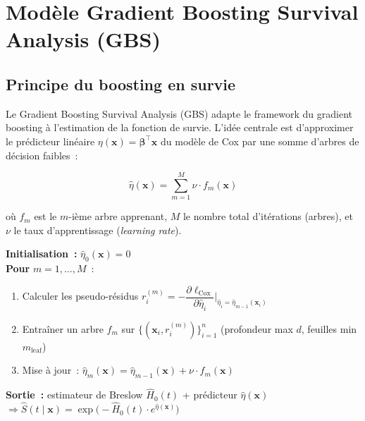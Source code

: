 \documentclass[a4paper,11pt]{article}
\newcommand{\Ssurvival}{S}
\begin{document}
\section{Modèle Gradient Boosting Survival Analysis (GBS)}

\subsection{Principe du boosting en survie}

Le Gradient Boosting Survival Analysis (GBS) adapte le framework du gradient boosting à
l'estimation de la fonction de survie. L'idée centrale est d'approximer le prédicteur linéaire
$\eta(\mathbf{x}) = \boldsymbol{\beta}^\top \mathbf{x}$ du modèle de Cox par une somme d'arbres de
décision faibles~:

\begin{equation}
  \hat{\eta}(\mathbf{x}) = \sum_{m=1}^{M} \nu \cdot f_m(\mathbf{x})
  \label{eq:boosting}
\end{equation}

où $f_m$ est le $m$-ième arbre apprenant, $M$ le nombre total d'itérations (arbres), et $\nu$ le
taux d'apprentissage (\emph{learning rate}).

\begin{tcolorbox}[defstyle, title={Algorithme GBS -- Pseudo-code}]
\textbf{Initialisation~:} $\hat{\eta}_0(\mathbf{x}) = 0$ \\[0.3em]
\textbf{Pour} $m = 1, \ldots, M$~:
\begin{enumerate}[leftmargin=1.5em, label=\arabic*.]
  \item Calculer les pseudo-résidus $r_i^{(m)} = -\dfrac{\partial \ell_{\mathrm{Cox}}}{\partial
    \hat{\eta}_i}\Bigg|_{\hat{\eta}_i = \hat{\eta}_{m-1}(\mathbf{x}_i)}$
  \item Entraîner un arbre $f_m$ sur $\{(\mathbf{x}_i, r_i^{(m)})\}_{i=1}^n$
    (profondeur max $d$, feuilles min $m_{\mathrm{leaf}}$)
  \item Mise à jour~: $\hat{\eta}_m(\mathbf{x}) = \hat{\eta}_{m-1}(\mathbf{x}) +
    \nu \cdot f_m(\mathbf{x})$
\end{enumerate}
\textbf{Sortie~:} estimateur de Breslow $\hat{H}_0(t)$ + prédicteur $\hat{\eta}(\mathbf{x})$
$\Rightarrow \hat{\Ssurvival}(t \mid \mathbf{x}) = \exp\!\bigl(-\hat{H}_0(t) \cdot
e^{\hat{\eta}(\mathbf{x})}\bigr)$
\end{tcolorbox}
\end{document}
